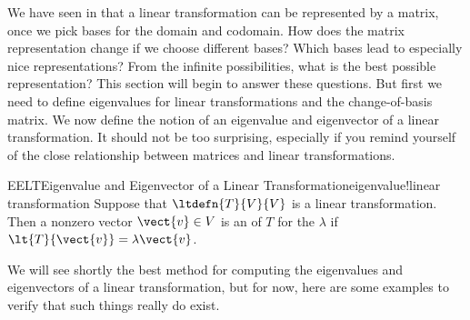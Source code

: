 %
We have seen in  that a linear transformation can be represented by a matrix, once we pick bases for the domain and codomain.  How does the matrix representation change if we choose different bases?  Which bases lead to especially nice representations?  From the infinite possibilities, what is the best possible representation?  This section will begin to answer these questions.  But first we need to define eigenvalues for linear transformations and the change-of-basis matrix.
%
%
We now define the notion of an eigenvalue and eigenvector of a linear transformation.  It should not be too surprising, especially if you remind yourself of the close relationship between matrices and linear transformations.
%
\begin{definition}{EELT}{Eigenvalue and Eigenvector of a Linear Transformation}{eigenvalue!linear transformation}
Suppose that $\ltdefn{T}{V}{V}$ is a linear transformation.  Then a nonzero vector $\vect{v}\in V$ is an  of $T$ for the  $\lambda$ if $\lt{T}{\vect{v}}=\lambda\vect{v}$.
\end{definition}
%
We will see shortly the best method for computing the eigenvalues and eigenvectors of a linear transformation, but for now, here are some examples to verify that such things really do exist.\par
%
%
